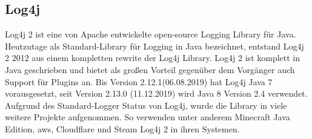 
\subsection{Log4j}\label{subsec:log4j}
Log4j 2 ist eine von Apache entwickelte open-source Logging Library für Java.
Heutzutage als Standard-Library für Logging in Java bezeichnet, entstand Log4j 2 2012 aus einem kompletten rewrite der Log4j Library.
Log4j 2 ist komplett in Java geschrieben und bietet als großen Vorteil gegenüber dem Vorgänger auch Support für Plugins an.
Bis Version 2.12.1(06.08.2019) hat Log4j Java 7 vorausgesetzt, seit Version 2.13.0 (11.12.2019) wird Java 8 Version 2.4 verwendet.
Aufgrund des Standard-Logger Status von Log4j, wurde die Library in viele weitere Projekte aufgenommen.
So verwenden unter anderem Minecraft Java Edition, \gls{aws}, Cloudflare und Steam Log4j 2 in ihren Systemen.
